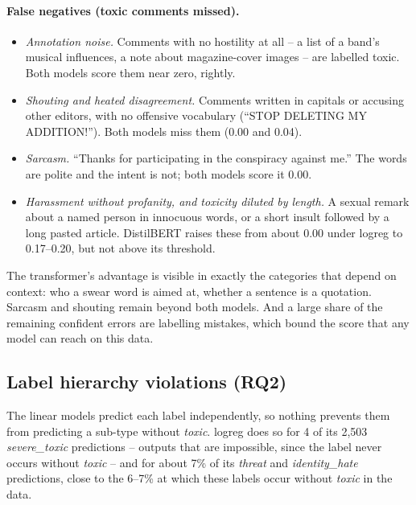 \documentclass[11pt,a4paper]{article}
\begin{document}
\paragraph{False negatives (toxic comments missed).}
\begin{itemize}
  \item \emph{Annotation noise.}  Comments with no hostility at all -- a list
        of a band's musical influences, a note about magazine-cover images --
        are labelled toxic.  Both models score them near zero, rightly.
  \item \emph{Shouting and heated disagreement.}  Comments written in capitals
        or accusing other editors, with no offensive vocabulary
        (``STOP DELETING MY ADDITION!'').  Both models miss them (0.00 and
        0.04).
  \item \emph{Sarcasm.}  ``Thanks for participating in the conspiracy against
        me.''  The words are polite and the intent is not; both models score
        it 0.00.
  \item \emph{Harassment without profanity, and toxicity diluted by length.}
        A sexual remark about a named person in innocuous words, or a short
        insult followed by a long pasted article.  DistilBERT raises these
        from about 0.00 under logreg to 0.17--0.20, but not above its
        threshold.
\end{itemize}

The transformer's advantage is visible in exactly the categories that depend
on context: who a swear word is aimed at, whether a sentence is a quotation.
Sarcasm and shouting remain beyond both models.  And a large share of the
remaining confident errors are labelling mistakes, which bound the score that
any model can reach on this data.

\subsection{Label hierarchy violations (RQ2)}
\label{sec:hierarchy}

The linear models predict each label independently, so nothing prevents them
from predicting a sub-type without \emph{toxic}.  logreg does so for 4 of its
2,503 \emph{severe\_toxic} predictions -- outputs that are impossible, since
the label never occurs without \emph{toxic} -- and for about 7\% of its
\emph{threat} and \emph{identity\_hate} predictions, close to the 6--7\% at
which these labels occur without \emph{toxic} in the data.
\end{document}
